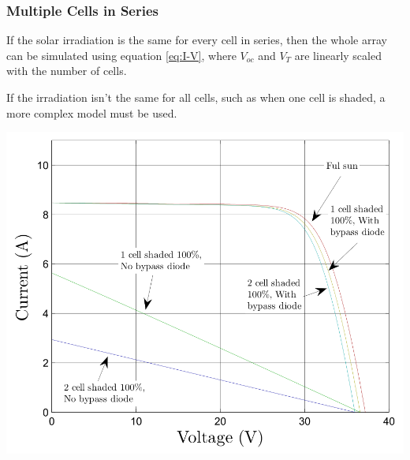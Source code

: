 \subsubsection{Multiple Cells in Series}

If the solar irradiation is the same  for  every  cell in series, then the whole
array  can be simulated using equation \eqref{eq:I-V}, where $V_{oc}$  and  $V_T$
are linearly scaled with the number of cells.

If the irradiation isn't the same for all  cells,  such  as  when  one  cell  is
shaded, a more complex model must be used.

\begin{minipage}{0.5\textwidth}
    \center
    \includegraphics[width=\textwidth]{images/model/shaded.png}
    \label{fig:model:shaded}
\end{minipage}
